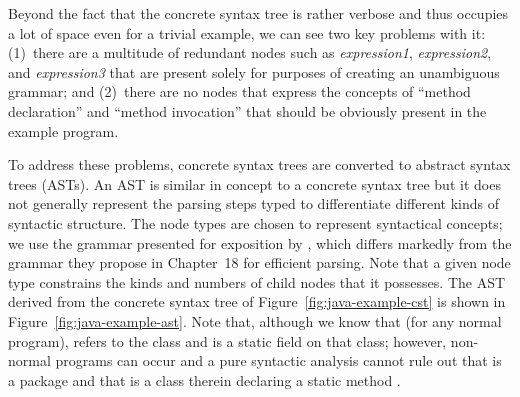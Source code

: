 Beyond the fact that the concrete syntax tree is rather verbose and thus occupies a lot of space even for a trivial example, we can see two key problems with it: (1)~there are a multitude of redundant nodes such as \textit{expression1}, \textit{expression2}, and \textit{expression3} that are present solely for purposes of creating an unambiguous grammar; and (2)~there are no nodes that express the concepts of ``method declaration'' and ``method invocation'' that should be obviously present in the example program.

To address these problems, concrete syntax trees are converted to abstract syntax trees (ASTs). An AST is similar in concept to a concrete syntax tree but it does not generally represent the parsing steps typed to differentiate different kinds of syntactic structure.  The node types are chosen to represent syntactical concepts; we use the grammar presented for exposition by \citet{2012:book:gosling}, which differs markedly from the grammar they propose in Chapter~18 for efficient parsing. Note that a given node type constrains the kinds and numbers of child nodes that it possesses.  The AST derived from the concrete syntax tree of Figure~\ref{fig:java-example-cst} is shown in Figure~\ref{fig:java-example-ast}.  Note that, although we know that (for any normal program),  refers to the class  and  is a static field on that class; however, non-normal programs can occur and a pure syntactic analysis cannot rule out that  is a package and that  is a class therein declaring a static method .

